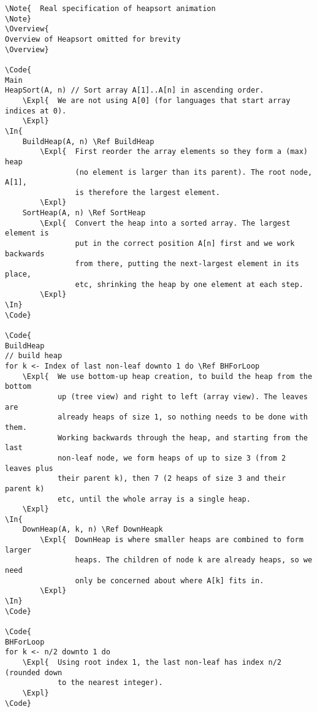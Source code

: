 \documentclass[11pt]{article}
\begin{document}
\begin{verbatim}
\Note{  Real specification of heapsort animation
\Note}
\Overview{
Overview of Heapsort omitted for brevity
\Overview}

\Code{
Main
HeapSort(A, n) // Sort array A[1]..A[n] in ascending order.
    \Expl{  We are not using A[0] (for languages that start array indices at 0).
    \Expl}
\In{
    BuildHeap(A, n) \Ref BuildHeap 
        \Expl{  First reorder the array elements so they form a (max) heap
                (no element is larger than its parent). The root node, A[1],
                is therefore the largest element.  
        \Expl}
    SortHeap(A, n) \Ref SortHeap 
        \Expl{  Convert the heap into a sorted array. The largest element is
                put in the correct position A[n] first and we work backwards 
                from there, putting the next-largest element in its place, 
                etc, shrinking the heap by one element at each step. 
        \Expl}
\In}
\Code}

\Code{
BuildHeap
// build heap
for k <- Index of last non-leaf downto 1 do \Ref BHForLoop 
    \Expl{  We use bottom-up heap creation, to build the heap from the bottom
            up (tree view) and right to left (array view). The leaves are 
            already heaps of size 1, so nothing needs to be done with them. 
            Working backwards through the heap, and starting from the last 
            non-leaf node, we form heaps of up to size 3 (from 2 leaves plus
            their parent k), then 7 (2 heaps of size 3 and their parent k) 
            etc, until the whole array is a single heap. 
    \Expl}
\In{
    DownHeap(A, k, n) \Ref DownHeapk 
        \Expl{  DownHeap is where smaller heaps are combined to form larger
                heaps. The children of node k are already heaps, so we need
                only be concerned about where A[k] fits in. 
        \Expl}
\In}
\Code}

\Code{
BHForLoop
for k <- n/2 downto 1 do 
    \Expl{  Using root index 1, the last non-leaf has index n/2 (rounded down
            to the nearest integer).
    \Expl}
\Code}


\end{verbatim}
\end{document}
